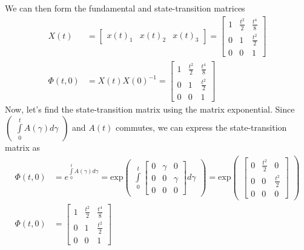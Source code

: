 \documentclass[twoside]{article}
\begin{document}
%
We can then form the fundamental and state-transition matrices 
%
\begin{align*}
	X(t) &= \begin{bmatrix} x(t)_1 & x(t)_2 & x(t)_3 \end{bmatrix}  = \begin{bmatrix} 1 & \frac{t^2}{2} & \frac{t^4}{8} \\ 0 & 1 & \frac{t^2}{2} \\ 0 & 0 & 1 \end{bmatrix} 
	\\
	\Phi(t,0) &= X(t)X(0)^{-1} = \begin{bmatrix} 1 & \frac{t^2}{2} & \frac{t^4}{8} \\ 0 & 1 & \frac{t^2}{2} \\ 0 & 0 & 1 \end{bmatrix} 
\end{align*}
% 
Now, let's find the state-transition matrix using the matrix exponential. Since $\begin{pmatrix} \int\limits_{0}^{t} A(\gamma) d\gamma \end{pmatrix}$ and $A(t)$ commutes, we can express the state-transition matrix as
%
\begin{align*}
	\Phi(t,0) &= e^{ \int\limits_{0}^{t} A(\gamma) d\gamma } 
	= \mathrm{exp} \begin{pmatrix} \int\limits_{0}^{t} \begin{bmatrix} 0 & \gamma & 0 \\ 0 & 0 & \gamma \\ 0 & 0 & 0 \end{bmatrix} d\gamma \end{pmatrix}	
	= \mathrm{exp} \begin{pmatrix} \begin{bmatrix} 0 & \frac{t^2}{2} & 0 \\ 0 & 0 & \frac{t^2}{2} \\ 0 & 0 & 0 \end{bmatrix} \end{pmatrix}	
	\\
	\Phi(t,0) &= \begin{bmatrix} 1 & \frac{t^2}{2} & \frac{t^4}{8} \\ 0 & 1 & \frac{t^2}{2} \\ 0 & 0 & 1 \end{bmatrix} 
\end{align*}
% 
\end{document}
